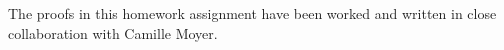 The proofs in this homework assignment have been worked and written in close collaboration with Camille Moyer. 